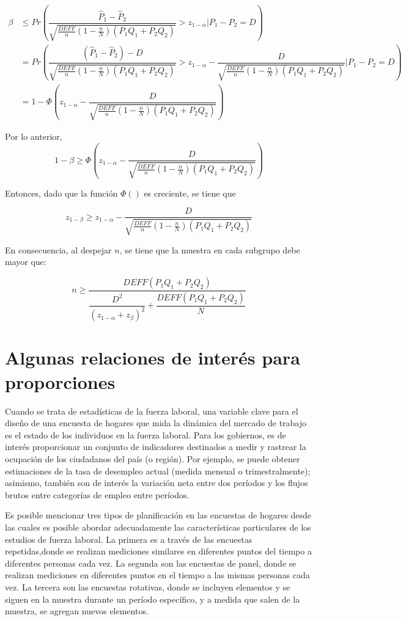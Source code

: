 \documentclass[
  12pt,
]{book}
\begin{document}
\begin{align*}
\beta &\leq Pr\left(\dfrac{\hat{P}_1-\hat{P}_2}{\sqrt{\frac{DEFF}{n}\left(1-\frac{n}{N}\right)(P_1Q_1+P_2Q_2)}} > z_{1-\alpha} \left. | \right. P_1 -P_2 =D \right)\\
&= Pr\left(\dfrac{(\hat{P}_1-\hat{P}_2)-D}{\sqrt{\frac{DEFF}{n}\left(1-\frac{n}{N}\right)(P_1Q_1+P_2Q_2)}} > z_{1-\alpha} - \dfrac{D}{\sqrt{\frac{DEFF}{n}\left(1-\frac{n}{N}\right)(P_1Q_1+P_2Q_2)}} | P_1 -P_2 =D
\right)\\
&= 1-\Phi\left(z_{1-\alpha} - \dfrac{D}{\sqrt{\frac{DEFF}{n}\left(1-\frac{n}{N}\right)(P_1Q_1+P_2Q_2)}} \right)
\end{align*}

Por lo anterior,
\[
1-\beta \geq \Phi\left(z_{1-\alpha} - \dfrac{D}{\sqrt{\frac{DEFF}{n}\left(1-\frac{n}{N}\right)(P_1Q_1+P_2Q_2)}} \right)
\]

Entonces, dado que la función \(\Phi()\) es creciente, se tiene que

\[
z_{1-\beta} \geq z_{1-\alpha} - \dfrac{D}{\sqrt{\frac{DEFF}{n}\left(1-\frac{n}{N}\right)(P_1Q_1+P_2Q_2)}} 
\]

En consecuencia, al despejar \(n\), se tiene que la muestra en cada subgrupo debe mayor que:

\[
n \geq \dfrac{DEFF(P_1Q_1+P_2Q_2)}{\dfrac{D^2}{(z_{1-\alpha}+z_{\beta})^2}+\dfrac{DEFF(P_1Q_1+P_2Q_2)}{N}}
\]

\hypertarget{algunas-relaciones-de-interuxe9s-para-proporciones}{%
\section{Algunas relaciones de interés para proporciones}\label{algunas-relaciones-de-interuxe9s-para-proporciones}}

Cuando se trata de estadísticas de la fuerza laboral, una variable clave para el diseño de una encuesta de hogares que mida la dinámica del mercado de trabajo es el estado de los individuos en la fuerza laboral. Para los gobiernos, es de interés proporcionar un conjunto de indicadores destinados a medir y rastrear la ocupación de los ciudadanos del país (o región). Por ejemplo, se puede obtener estimaciones de la tasa de desempleo actual (medida mensual o trimestralmente); asimismo, también son de interés la variación neta entre dos períodos y los flujos brutos entre categorías de empleo entre períodos.

Es posible mencionar tres tipos de planificación en las encuestas de hogares desde las cuales es posible abordar adecuadamente las características particulares de los estudios de fuerza laboral. La primera es a través de las encuestas repetidas,donde se realizan mediciones similares en diferentes puntos del tiempo a diferentes personas cada vez. La segunda son las encuestas de panel, donde se realizan mediciones en diferentes puntos en el tiempo a las mismas personas cada vez. La tercera son las encuestas rotativas, donde se incluyen elementos y se siguen en la muestra durante un período específico, y a medida que salen de la muestra, se agregan nuevos elementos.
\end{document}
